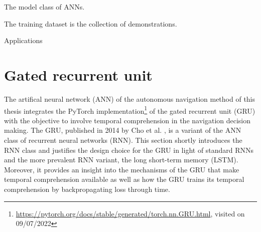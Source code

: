 The model class of ANNs.




The training dataset is the collection of demonstrations.

Applications 










\section{Gated recurrent unit} \label{sec:gru}
The artifical neural network (ANN) of the autonomous navigation method of this thesis
integrates the PyTorch implementation\footnote{
    \url{https://pytorch.org/docs/stable/generated/torch.nn.GRU.html}, visited on 09/07/2022
}
of the gated recurrent unit (GRU)
with the objective to involve temporal comprehension in
the navigation decision making.
The GRU,
published in 2014 by Cho et al. \cite{Cho2014},
is a variant of the ANN class of recurrent neural networks (RNN).
This section shortly introduces the RNN class
and justifies the design choice for the GRU
in light of standard RNNs and 
the more prevalent RNN variant,
the long short-term memory (LSTM).
Moreover, it provides an insight into
the mechanisms of the GRU that make temporal comprehension available
as well as how the 
GRU trains its temporal comprehension by backpropagating 
loss through time.

